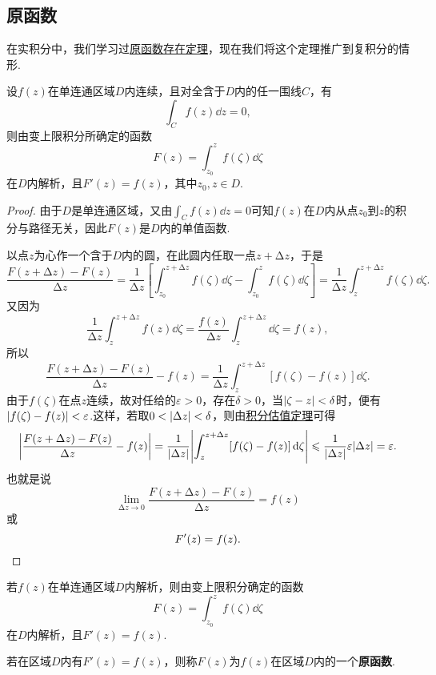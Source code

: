 \subsection{原函数}
在实积分中，我们学习过\hyperref[theorem:定积分.原函数存在定理]{原函数存在定理}，现在我们将这个定理推广到复积分的情形.
\begin{theorem}\label{theorem:解析函数的积分表示.原函数1}
设\(f(z)\)在单连通区域\(D\)内连续，且对全含于\(D\)内的任一围线\(C\)，有\[
\int_C f(z) \dd{z} = 0,
\]则由变上限积分所确定的函数\[
F(z) = \int_{z_0}^z f(\zeta) \dd{\zeta}
\]在\(D\)内解析，且\(F'(z) = f(z)\)，其中\(z_0, z \in D\).
\begin{proof}
由于\(D\)是单连通区域，又由\(\int_C f(z) \dd{z}=0\)可知\(f(z)\)在\(D\)内从点\(z_0\)到\(z\)的积分与路径无关，因此\(F(z)\)是\(D\)内的单值函数.

以点\(z\)为心作一个含于\(D\)内的圆，在此圆内任取一点\(z+\increment z\)，于是\[
\frac{F(z+\increment z)-F(z)}{\increment z}
= \frac{1}{\increment z}\left[
 \int_{z_0}^{z+\increment z} f(\zeta) \dd{\zeta}
 -\int_{z_0}^z f(\zeta) \dd{\zeta}
\right]
= \frac{1}{\increment z} \int_z^{z+\increment z} f(\zeta) \dd{\zeta}.
\]又因为\[
\frac{1}{\increment z} \int_z^{z+\increment z} f(z) \dd{\zeta}
= \frac{f(z)}{\increment z} \int_z^{z+\increment z} \dd{\zeta} = f(z),
\]所以\[
\frac{F(z+\increment z)-F(z)}{\increment z} - f(z)
= \frac{1}{\increment z} \int_z^{z+\increment z} [f(\zeta)-f(z)]\dd{\zeta}.
\]由于\(f(\zeta)\)在点\(z\)连续，故对任给的\(\varepsilon > 0\)，存在\(\delta > 0\)，当\(\abs{\zeta - z} < \delta\)时，便有\(\abs{f(\zeta)-f(z)} < \varepsilon\).这样，若取\(0<\abs{\Delta z}<\delta\)，则由\hyperref[theorem:解析函数的积分表示.积分估值定理]{积分估值定理}可得\[
\abs{\frac{F(z+\Delta z)-F(z)}{\Delta z} - f(z)}
= \frac{1}{\abs{\Delta z}} \abs{ \int_z^{z+\Delta z} [f(\zeta)-f(z)]\dd{\zeta} }
\leqslant \frac{1}{\abs{\Delta z}} \varepsilon \abs{\Delta z}
= \varepsilon.
\]也就是说\[
\lim\limits_{\increment z\to0} \frac{F(z+\increment z)-F(z)}{\increment z} = f(z)
\]或\[
F'(z) = f(z).
\qedhere
\]
\end{proof}
\end{theorem}

\begin{corollary}\label{theorem:解析函数的积分表示.原函数2}
若\(f(z)\)在单连通区域\(D\)内解析，则由变上限积分确定的函数\[
F(z) = \int_{z_0}^z f(\zeta) \dd{\zeta}
\]在\(D\)内解析，且\(F'(z) = f(z)\).
\end{corollary}

\begin{definition}
若在区域\(D\)内有\(F'(z)=f(z)\)，则称\(F(z)\)为\(f(z)\)在区域\(D\)内的一个\textbf{原函数}.
\end{definition}

